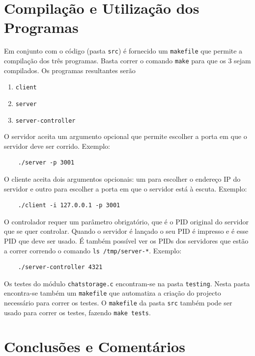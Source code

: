 \documentclass[a4paper]{article}
\begin{document}
	\section{Compilação e Utilização dos Programas}

	Em conjunto com o código (pasta \texttt{src}) é fornecido um \texttt{makefile} que permite a compilação dos três programas. Basta correr o comando \texttt{make} para que os 3 sejam compilados. Os programas resultantes serão 

	\begin{enumerate}
		\item \texttt{client} 
		\item \texttt{server} 
		\item \texttt{server-controller} 
	\end{enumerate}

	O servidor aceita um argumento opcional que permite escolher a porta em que o servidor deve ser corrido. Exemplo:

	\begin{verbatim}
	./server -p 3001 
	\end{verbatim}

	O cliente aceita dois argumentos opcionais: um para escolher o endereço IP do servidor e outro para escolher a porta em que o servidor está à escuta. Exemplo:

	\begin{verbatim}
	./client -i 127.0.0.1 -p 3001
	\end{verbatim}

	O controlador requer um parâmetro obrigatório, que é o PID original do servidor que se quer controlar. Quando o servidor é lançado o seu PID é impresso e é esse PID que deve ser usado. É também possível ver os PIDs dos servidores que estão a correr correndo o comando \texttt{ls /tmp/server-*}. Exemplo: 

	\begin{verbatim}
	./server-controller 4321 
	\end{verbatim}

	Os testes do módulo \texttt{chatstorage.c} encontram-se na pasta \texttt{testing}. Nesta pasta encontra-se também um \texttt{makefile} que automatiza a criação do projecto necessário para correr os testes. O \texttt{makefile} da pasta \texttt{src} também pode ser usado para correr os testes, fazendo \texttt{make tests}.


	\section{Conclusões e Comentários}
\end{document}

